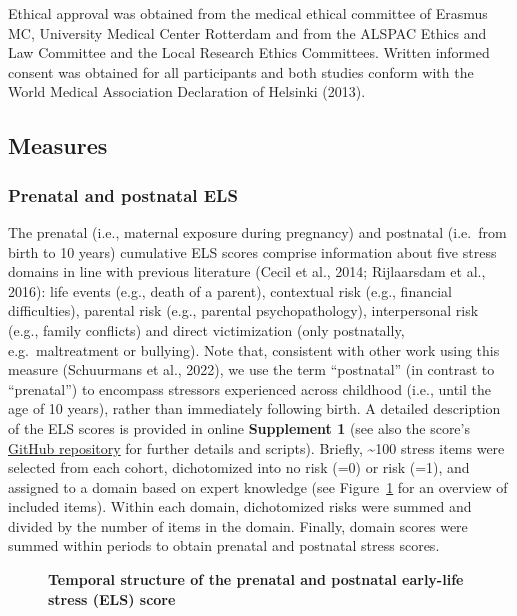 \documentclass[
  letterpaper,
  DIV=11,
  numbers=noendperiod]{scrreport}
\begin{document}
Ethical approval was obtained from the medical ethical committee of
Erasmus MC, University Medical Center Rotterdam and from the ALSPAC
Ethics and Law Committee and the Local Research Ethics Committees.
Written informed consent was obtained for all participants and both
studies conform with the World Medical Association Declaration of
Helsinki (2013).

\subsection{Measures}\label{measures}

\subsubsection{Prenatal and postnatal
ELS}\label{prenatal-and-postnatal-els}

The prenatal (i.e., maternal exposure during pregnancy) and postnatal
(i.e.~from birth to 10 years) cumulative ELS scores comprise information
about five stress domains in line with previous literature (Cecil et
al., 2014; Rijlaarsdam et al., 2016): life events (e.g., death of a
parent), contextual risk (e.g., financial difficulties), parental risk
(e.g., parental psychopathology), interpersonal risk (e.g., family
conflicts) and direct victimization (only postnatally, e.g.~maltreatment
or bullying). Note that, consistent with other work using this measure
(Schuurmans et al., 2022), we use the term ``postnatal'' (in contrast to
``prenatal'') to encompass stressors experienced across childhood (i.e.,
until the age of 10 years), rather than immediately following birth. A
detailed description of the ELS scores is provided in online
\textbf{Supplement 1} (see also the score's
\href{https://github.com/SereDef/cumulative-ELS-score}{GitHub
repository} for further details and scripts). Briefly,
\textasciitilde100 stress items were selected from each cohort,
dichotomized into no risk (=0) or risk (=1), and assigned to a domain
based on expert knowledge (see Figure~\ref{fig-1.1} for an overview of
included items). Within each domain, dichotomized risks were summed and
divided by the number of items in the domain. Finally, domain scores
were summed within periods to obtain prenatal and postnatal stress
scores.

\begin{figure}[H]


\caption{\label{fig-1.1}\textbf{Temporal structure of the prenatal and
postnatal early-life stress (ELS) score}}

\end{figure}%
\end{document}
